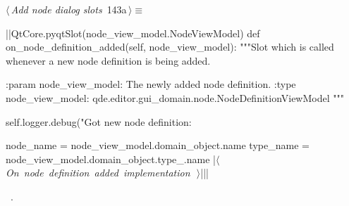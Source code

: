 \documentclass[%
    a4paper,    %
    justified,  %
    nobib,      %
    openany     %
]{tufte-book}
\begin{document}
\begin{flushleft} \small
\begin{minipage}{\linewidth}\label{scrap153}\raggedright\small
{} $\langle\,${\itshape Add node dialog slots}\nobreak\ {\footnotesize {143a}}$\,\rangle\equiv$
\vspace{-1ex}
\begin{pythoncode}
|\normalfont{}\fontfamily{}|QtCore.pyqtSlot(node_view_model.NodeViewModel)
def on_node_definition_added(self, node_view_model):
    """Slot which is called whenever a new node definition is being added.

    :param node_view_model: The newly added node definition.
    :type  node_view_model: qde.editor.gui_domain.node.NodeDefinitionViewModel
    """

    self.logger.debug("Got new node definition: %

    node_name = node_view_model.domain_object.name
    type_name = node_view_model.domain_object.type_.name
    |\hbox{$\langle\,${\itshape On node definition added implementation}\nobreak\ {\footnotesize {}}$\,\rangle$}||\NWsep|
\end{pythoncode}
\vspace{1.5ex}
\footnotesize
\begin{list}{}{\setlength{\itemsep}{-\parsep}\setlength{\itemindent}{-\leftmargin}}
\item \NWtxtMacroRefIn\ .

\item{}
\end{list}
\end{minipage}\vspace{4ex}
\end{flushleft}
%
\end{document}

